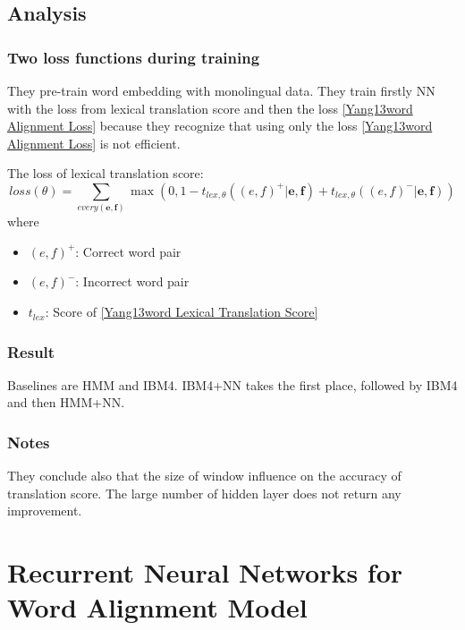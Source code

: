 \documentclass{article}
\begin{document}
\subsection{Analysis}
\subsubsection{Two loss functions during training}
They pre-train word embedding with monolingual data.
They train firstly NN with the loss from lexical translation score and then the loss \eqref{Yang13word Alignment Loss} because they recognize that using only the loss \eqref{Yang13word Alignment Loss} is not efficient.

The loss of lexical translation score:
\begin{equation}
loss(\theta) = \sum_{every(\textbf{e},\textbf{f})} \max(0 , 1 - t_{lex, \theta}((e,f)^+ | \textbf{e},\textbf{f}) + t_{lex, \theta}((e,f)^- | \textbf{e},\textbf{f}) )
\end{equation}
where
\begin{itemize}
\item $(e,f)^+$: Correct word pair
\item $(e,f)^-$: Incorrect word pair
\item $t_{lex}$: Score of \eqref{Yang13word Lexical Translation Score}
\end{itemize}

\subsubsection{Result}
Baselines are HMM and IBM4. IBM4+NN takes the first place, followed by IBM4 and then HMM+NN.

\subsubsection{Notes}
They conclude also that the size of window influence on the accuracy of translation score.
The large number of hidden layer does not return any improvement.

\section{Recurrent Neural Networks for Word Alignment Model \citep{Tamura14recurrent}}
\end{document}
